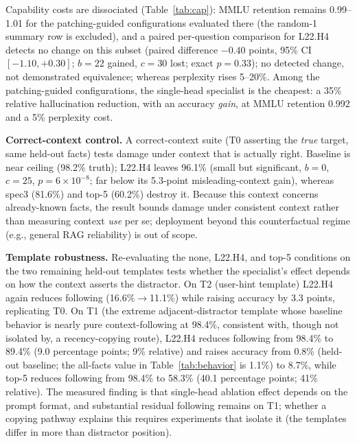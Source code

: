 \documentclass[paper]{ieice}
\newcommand{\spec}{L22.H4}
\begin{document}
Capability costs are dissociated (Table~\ref{tab:cap}): MMLU retention
remains 0.99--1.01 for the patching-guided configurations evaluated
there (the random-1 summary row is excluded), and a paired
per-question comparison for \spec{} detects no change on this subset
(paired difference $-0.40$ points, 95\% CI $[-1.10, +0.30]$; $b{=}22$
gained, $c{=}30$ lost; exact $p{=}0.33$); no detected change, not
demonstrated equivalence; whereas perplexity rises 5--20\%. Among the patching-guided configurations, the single-head specialist
is the cheapest: a 35\% relative hallucination reduction, with an
accuracy \emph{gain}, at MMLU retention 0.992 and a 5\% perplexity
cost.

\textbf{Correct-context control.} A correct-context suite (T0
asserting the \emph{true} target, same held-out facts) tests damage
under context that is actually right. Baseline is near ceiling (98.2\%
truth); \spec{} leaves 96.1\% (small but significant, $b{=}0$,
$c{=}25$, $p{=}6\times10^{-8}$; far below its 5.3-point misleading-context
gain), whereas spec3 (81.6\%) and top-5 (60.2\%) destroy it. Because
this context concerns already-known facts, the result bounds damage
under consistent context rather than measuring context \emph{use} per
se; deployment beyond this counterfactual regime (e.g., general RAG
reliability) is out of scope.

\textbf{Template robustness.} Re-evaluating the none, \spec{}, and top-5
conditions on the two remaining held-out templates tests whether the
specialist's effect depends on how the context asserts the distractor. On T2 (user-hint
template) \spec{} again reduces following (16.6\%$\to$11.1\%) while
raising accuracy by 3.3 points, replicating T0. On T1 (the extreme adjacent-distractor template whose baseline
behavior is nearly pure context-following at 98.4\%, consistent with,
though not isolated by, a recency-copying route), \spec{} reduces
following from
98.4\% to 89.4\% (9.0 percentage points; 9\% relative) and raises
accuracy from 0.8\% (held-out baseline; the all-facts value in
Table~\ref{tab:behavior} is 1.1\%) to 8.7\%, while top-5 reduces
following from 98.4\%
to 58.3\% (40.1 percentage points; 41\% relative). The measured
finding is that single-head ablation effect depends on the prompt
format, and substantial residual following remains on T1; whether a
copying pathway explains this requires experiments that isolate it
(the templates differ in more than distractor position).
\end{document}
